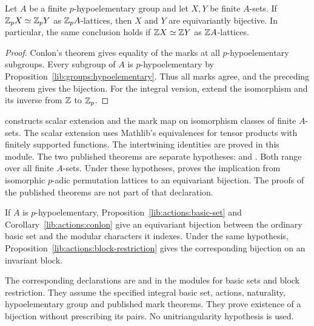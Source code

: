 \begin{corollary}
\label{lib:actions:conlon}
Let $A$ be a finite $p$-hypoelementary group and let $X,Y$ be finite
$A$-sets. If $\mathbb Z_p X\simeq\mathbb Z_p Y$ as $\mathbb Z_p A$-lattices, then
$X$ and $Y$ are equivariantly bijective. In particular, the same
conclusion holds if $\mathbb Z X\simeq\mathbb Z Y$ as $\mathbb Z A$-lattices.
\end{corollary}
\begin{proof}
Conlon's theorem gives equality of the marks at all
$p$-hypoelementary subgroups. Every subgroup of $A$ is
$p$-hypoelementary by Proposition~\ref{lib:groups:hypoelementary}.
Thus all marks agree, and the preceding theorem gives the bijection.
For the integral version, extend the isomorphism and its inverse
from $\mathbb Z$ to $\mathbb Z_p$.
\end{proof}
\begin{implementation}
 constructs scalar
extension and the mark map on isomorphism classes of finite $A$-sets.
The scalar extension uses Mathlib's equivalences for tensor products
with finitely supported functions. The intertwining identities are
proved in this module.
The two published theorems are separate hypotheses:
 and
. Both range over all finite
$A$-sets. Under these hypotheses,
 proves the implication from
isomorphic $p$-adic permutation lattices to an equivariant bijection.
The proofs of the published theorems are not part of that declaration.
\end{implementation}

If $A$ is $p$-hypoelementary, Proposition~\ref{lib:actions:basic-set}
and Corollary~\ref{lib:actions:conlon} give an equivariant bijection
between the ordinary basic set and the modular characters it indexes.
Under the same hypothesis, Proposition~\ref{lib:actions:block-restriction}
gives the corresponding bijection on an invariant block.
\begin{implementation}
The corresponding declarations are
 and
in the modules for basic sets and block restriction.
They assume the specified integral basic set, actions, naturality,
hypoelementary group and published mark theorems.
They prove existence of a bijection without prescribing its pairs.
No unitriangularity hypothesis is used.
\end{implementation}

